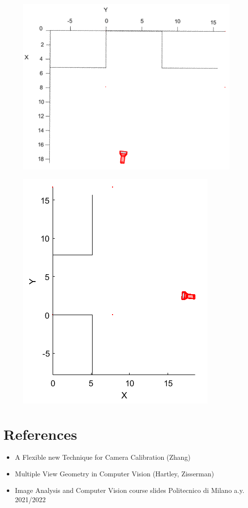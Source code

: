 \documentclass[11pt, oneside]{article}
\begin{document}
\begin{figure}[!h]
	\centering
	\begin{minipage}{.45\textwidth}
		\centering
		\includegraphics[scale = 0.46]{camera_localization_XY_1.png}
		\label{camera_localization_XY_1}
	\end{minipage}%
	\quad
	\begin{minipage}{.45\textwidth}
		\centering
		\includegraphics[scale = 0.65]{camera_localization_XY_2.png}
		\label{camera_localization_XY_2}
	\end{minipage}
\end{figure}
\section{References}
\begin{itemize}
	\item A Flexible new Technique for Camera Calibration (Zhang)
	\item Multiple View Geometry in Computer Vision (Hartley, Zisserman)
	\item Image Analysis and Computer Vision course slides Politecnico di Milano a.y. 2021/2022 
\end{itemize}
\end{document}
